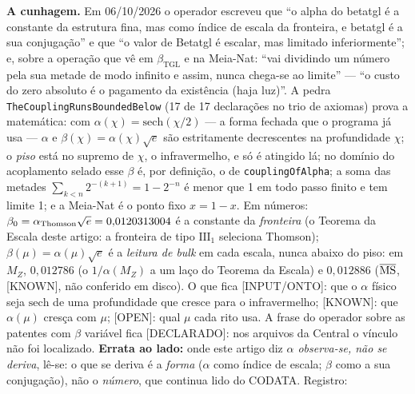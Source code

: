 \documentclass[11pt]{article}
\newcommand{\bTGL}{\beta_{\mathrm{TGL}}}\newcommand{\Msun}{M_{\odot}}\newcommand{\TGL}{\mathrm{TGL}}
\theoremstyle{definition}\newtheorem{deriv}{Derivação}
\begin{document}
\textbf{A cunhagem.} Em 06/10/2026 o operador escreveu que ``o alpha do betatgl é a constante da estrutura fina, mas como índice de escala da fronteira, e betatgl é a sua conjugação'' e que ``o valor de Betatgl é escalar, mas limitado inferiormente''; e, sobre a operação que vê em $\bTGL$ e na Meia-Nat: ``vai dividindo um número pela sua metade de modo infinito e assim, nunca chega-se ao limite'' --- ``o custo do zero absoluto é o pagamento da existência (haja luz)''. A pedra \texttt{TheCouplingRunsBoundedBelow} (17 de 17 declarações no trio de axiomas) prova a matemática: com $\alpha(\chi)=\mathrm{sech}(\chi/2)$ --- a forma fechada que o programa já usa --- $\alpha$ e $\beta(\chi)=\alpha(\chi)\sqrt e$ são estritamente decrescentes na profundidade $\chi$; o \emph{piso} está no supremo de $\chi$, o infravermelho, e só é atingido lá; no domínio do acoplamento selado esse $\beta$ é, por definição, o de \texttt{couplingOfAlpha}; a soma das metades $\sum_{k<n}2^{-(k+1)}=1-2^{-n}$ é menor que 1 em todo passo finito e tem limite 1; e a Meia-Nat é o ponto fixo $x=1-x$. Em números: $\beta_0=\alpha_{\rm Thomson}\sqrt e=0{,}0120313004$ é a constante da \emph{fronteira} (o Teorema da Escala deste artigo: a fronteira de tipo $\mathrm{III}_1$ seleciona Thomson); $\beta(\mu)=\alpha(\mu)\sqrt e$ é a \emph{leitura de bulk} em cada escala, nunca abaixo do piso: em $M_Z$, $0{,}012786$ (o $1/\alpha(M_Z)$ a um laço do Teorema da Escala) e $0{,}012886$ ($\overline{\rm MS}$, \textsf{[KNOWN]}, não conferido em disco). O que fica \textsf{[INPUT/ONTO]}: que o $\alpha$ físico seja $\mathrm{sech}$ de uma profundidade que cresce para o infravermelho; \textsf{[KNOWN]}: que $\alpha(\mu)$ cresça com $\mu$; \textsf{[OPEN]}: qual $\mu$ cada rito usa. A frase do operador sobre as patentes com $\beta$ variável fica \textsf{[DECLARADO]}: nos arquivos da Central o vínculo não foi localizado. \textbf{Errata ao lado:} onde este artigo diz \emph{$\alpha$ observa-se, não se deriva}, lê-se: o que se deriva é a \emph{forma} ($\alpha$ como índice de escala; $\beta$ como a sua conjugação), não o \emph{número}, que continua lido do CODATA. Registro: 
\end{document}
